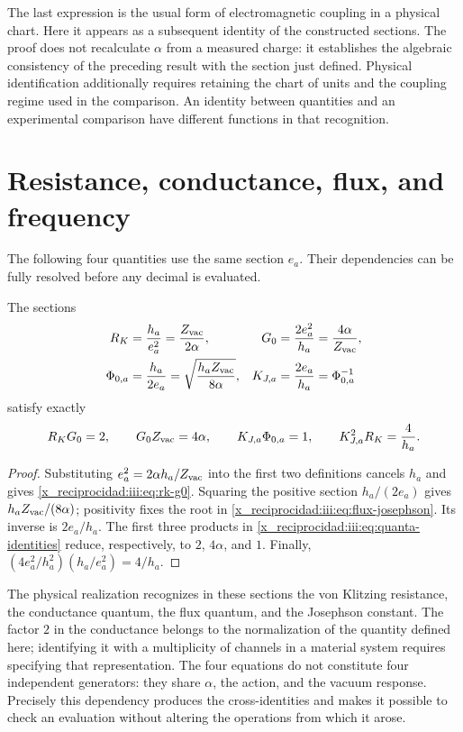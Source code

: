 The last expression is the usual form of electromagnetic coupling
in a physical chart. Here it appears as a subsequent identity of the constructed
sections. The proof does not recalculate $\alpha$ from a measured
charge: it establishes the algebraic consistency of the preceding result with the
section just defined. Physical identification additionally requires
retaining the chart of units and the coupling regime used in the
comparison. An identity between quantities and an experimental comparison
have different functions in that recognition.

\section{Resistance, conductance, flux, and frequency}

The following four quantities use the same section $e_a$. Their
dependencies can be fully resolved before any decimal is evaluated.

\begin{theorem}
The sections
\begin{align}
 R_K&=\frac{h_a}{e_a^2}=\frac{Z_{\rm vac}}{2\alpha},
 &G_0&=\frac{2e_a^2}{h_a}=\frac{4\alpha}{Z_{\rm vac}},
 \label{x_reciprocidad:iii:eq:rk-g0}\\
 \Phi_{0,a}&=\frac{h_a}{2e_a}
 =\sqrt{\frac{h_aZ_{\rm vac}}{8\alpha}},
 &K_{J,a}&=\frac{2e_a}{h_a}=\Phi_{0,a}^{-1}
 \label{x_reciprocidad:iii:eq:flux-josephson}
\end{align}
satisfy exactly
\begin{equation}
 R_KG_0=2,\qquad G_0Z_{\rm vac}=4\alpha,\qquad
 K_{J,a}\Phi_{0,a}=1,\qquad
 K_{J,a}^{2}R_K=\frac4{h_a}.
 \label{x_reciprocidad:iii:eq:quanta-identities}
\end{equation}
\end{theorem}
\begin{proof}
Substituting $e_a^2=2\alpha h_a/Z_{\rm vac}$ into the first two
definitions cancels $h_a$ and gives \eqref{x_reciprocidad:iii:eq:rk-g0}. Squaring
the positive section $h_a/(2e_a)$ gives
$h_aZ_{\rm vac}/(8\alpha)$; positivity fixes the root in
\eqref{x_reciprocidad:iii:eq:flux-josephson}. Its inverse is $2e_a/h_a$.
The first three products in \eqref{x_reciprocidad:iii:eq:quanta-identities}
reduce, respectively, to $2$, $4\alpha$, and $1$. Finally,
$(4e_a^2/h_a^2)(h_a/e_a^2)=4/h_a$.
\end{proof}

The physical realization recognizes in these sections the von
Klitzing resistance, the conductance quantum, the flux quantum, and the
Josephson constant. The factor $2$ in the conductance belongs to the normalization
of the quantity defined here; identifying it with a multiplicity of
channels in a material system requires specifying that representation.
The four equations do not constitute four independent generators:
they share $\alpha$, the action, and the vacuum response. Precisely this
dependency produces the cross-identities and makes it possible to check an
evaluation without altering the operations from which it arose.

